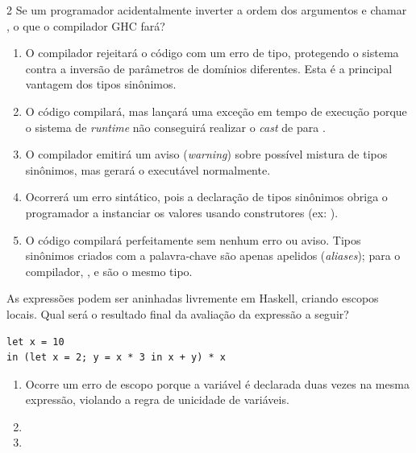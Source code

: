 \documentclass[a4paper,10pt,brazil]{article}
\begin{document}
\begin{multicols}{2}
Se um programador acidentalmente inverter a ordem dos argumentos e chamar , o que o compilador GHC fará?

\begin{enumerate}
  \item O compilador rejeitará o código com um erro de tipo, protegendo o sistema contra a inversão de parâmetros de domínios diferentes. Esta é a principal vantagem dos tipos sinônimos.

  \item O código compilará, mas lançará uma exceção em tempo de execução porque o sistema de \emph{runtime} não conseguirá realizar o \emph{cast} de  para .

  \item O compilador emitirá um aviso (\emph{warning}) sobre possível mistura de tipos sinônimos, mas gerará o executável normalmente.

  \item Ocorrerá um erro sintático, pois a declaração de tipos sinônimos obriga o programador a instanciar os valores usando construtores (ex: ).

  \item O código compilará perfeitamente sem nenhum erro ou aviso. Tipos sinônimos criados com a palavra-chave  são apenas apelidos (\emph{aliases}); para o compilador, ,  e  são o mesmo tipo.


\end{enumerate}

As expressões  podem ser aninhadas livremente em Haskell, criando escopos locais. Qual será o resultado final da avaliação da expressão a seguir?
\begin{verbatim}
let x = 10 
in (let x = 2; y = x * 3 in x + y) * x
\end{verbatim}

\begin{enumerate}
  \item Ocorre um erro de escopo porque a variável  é declarada duas vezes na mesma expressão, violando a regra de unicidade de variáveis.

  \item {}

  \item {}


\end{enumerate}
\end{multicols}
\end{document}
